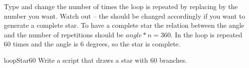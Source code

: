 

Type \newcommand{\remove}[1]{the}  and change the number of
times the loop is repeated by replacing  by the number you want.
\newcommand{\replace}[2]{Pay attention that}{Watch out -- the}  should be changed accordingly if you want
to generate a complete star. To have a complete star the relation
between the angle and the number of \newcommand{\replace}[2]{repetition}{repetitions} should be $angle * n =
360$. In \newcommand{\remove}[1]{the}  the loop is repeated 60 times and the angle is 6 degrees, so the star is complete. 

\begin{exofig}{loopStar60}\label{scr:starsixty}
Write a script that draws \newcommand{\replace}[2]{A}{a} star with 60 branches.
\end{exofig}

